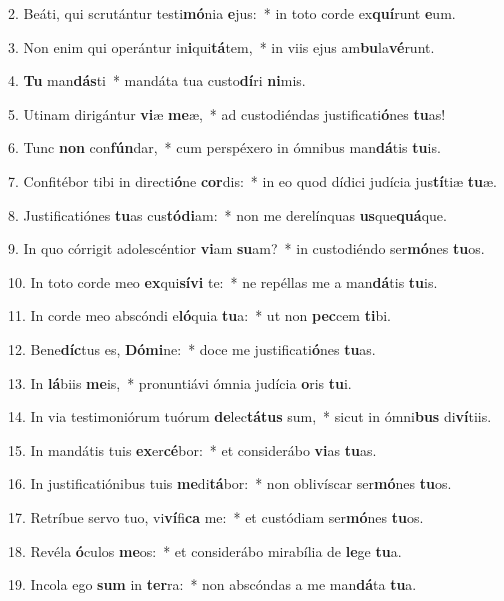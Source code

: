 2. Beáti, qui scrutántur testi\textbf{mó}nia \textbf{e}jus:~*  in toto corde ex\textbf{quí}runt \textbf{e}um.\

3. Non enim qui operántur in\textbf{i}qui\textbf{tá}tem,~*  in viis ejus am\textbf{bu}la\textbf{vé}runt.\

4. \textbf{Tu} man\textbf{dás}ti~*  mandáta tua custo\textbf{dí}ri \textbf{ni}mis.\

5. Utinam dirigántur \textbf{vi}æ \textbf{me}æ,~*  ad custodiéndas justificati\textbf{ó}nes \textbf{tu}as!\

6. Tunc \textbf{non} con\textbf{fún}dar,~*  cum perspéxero in ómnibus man\textbf{dá}tis \textbf{tu}is.\

7. Confitébor tibi in directi\textbf{ó}ne \textbf{cor}dis:~*  in eo quod dídici judícia jus\textbf{tí}tiæ \textbf{tu}æ.\

8. Justificatiónes \textbf{tu}as cus\textbf{tó}\textbf{di}am:~*  non me derelínquas \textbf{us}que\textbf{quá}que.\

9. In quo córrigit adolescéntior \textbf{vi}am \textbf{su}am?~*  in custodiéndo ser\textbf{mó}nes \textbf{tu}os.\

10. In toto corde meo \textbf{ex}qui\textbf{sí}\textbf{vi} te:~*  ne repéllas me a man\textbf{dá}tis \textbf{tu}is.\

11. In corde meo abscóndi e\textbf{ló}quia \textbf{tu}a:~*  ut non \textbf{pec}cem \textbf{ti}bi.\

12. Bene\textbf{díc}tus es, \textbf{Dó}\textbf{mi}ne:~*  doce me justificati\textbf{ó}nes \textbf{tu}as.\

13. In \textbf{lá}biis \textbf{me}is,~*  pronuntiávi ómnia judícia \textbf{o}ris \textbf{tu}i.\

14. In via testimoniórum tuórum \textbf{de}lec\textbf{tá}\textbf{tus} sum,~*  sicut in ómni\textbf{bus} di\textbf{ví}tiis.\

15. In mandátis tuis \textbf{ex}er\textbf{cé}bor:~*  et considerábo \textbf{vi}as \textbf{tu}as.\

16. In justificatiónibus tuis \textbf{me}di\textbf{tá}bor:~*  non oblivíscar ser\textbf{mó}nes \textbf{tu}os.\

17. Retríbue servo tuo, vi\textbf{ví}fi\textbf{ca} me:~*  et custódiam ser\textbf{mó}nes \textbf{tu}os.\

18. Revéla \textbf{ó}culos \textbf{me}os:~*  et considerábo mirabília de \textbf{le}ge \textbf{tu}a.\

19. Incola ego \textbf{sum} in \textbf{ter}ra:~*  non abscóndas a me man\textbf{dá}ta \textbf{tu}a.\

